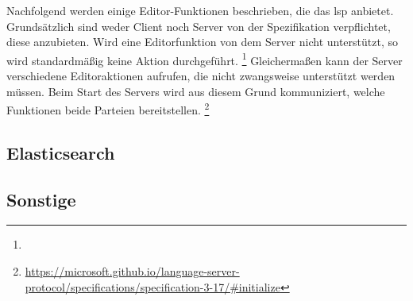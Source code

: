 Nachfolgend werden einige Editor-Funktionen beschrieben, die das \ac{lsp} anbietet.
Grundsätzlich sind weder Client noch Server von der Spezifikation verpflichtet, diese anzubieten.
Wird eine Editorfunktion von dem Server nicht unterstützt, so wird standardmäßig keine Aktion durchgeführt.
\footnote{}
Gleichermaßen kann der Server verschiedene Editoraktionen aufrufen, die nicht zwangsweise unterstützt werden müssen.
Beim Start des Servers wird aus diesem Grund kommuniziert, welche Funktionen beide Parteien bereitstellen.
\footnote{\url{https://microsoft.github.io/language-server-protocol/specifications/specification-3-17/\#initialize}}


\subsection{Elasticsearch}\label{subsec:elasticsearch}


\subsection{Sonstige}\label{subsec:other-libraries}

